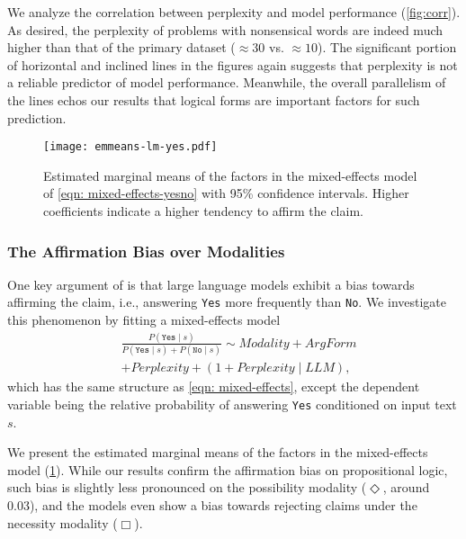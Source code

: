 We analyze the correlation between perplexity and model performance (\cref{fig:corr}).
As desired, the perplexity of problems with nonsensical words are indeed much higher than that of the primary dataset ($\approx 30$ vs. $\approx 10$).
The significant portion of horizontal and inclined lines in the figures again suggests that perplexity is not a reliable predictor of model performance.
Meanwhile, the overall parallelism of the lines echos our results that logical forms are important factors for such prediction.

\begin{figure}[t]
    \centering
    \vspace{-5pt}
    \texttt{[image: emmeans-lm-yes.pdf]}
    \vspace{-15pt}
    \caption{
        \label{fig:affirmation-rejection}
        Estimated marginal means of the factors in the mixed-effects model of \cref{eqn: mixed-effects-yesno} with 95\% confidence intervals. Higher coefficients indicate a higher tendency to affirm the claim.
    }
    \vspace{-10pt}
\end{figure}
\subsubsection{The Affirmation Bias over Modalities}
\label{subsec:affirmation-bias}

One key argument of \citet{dentella-etal-2023-systematic} is that large language models exhibit a bias towards affirming the claim, i.e., answering \texttt{Yes} more frequently than \texttt{No}.
We investigate this phenomenon by fitting a mixed-effects model
\begin{align}
     & \frac{P(\texttt{Yes}\mid s)}{P(\texttt{Yes} \mid s) + P(\texttt{No} \mid s)} \sim  \textit{Modality} + \textit{ArgForm} \nonumber \\
     & + \textit{Perplexity} + (1 + \textit{Perplexity} \mid \textit{LLM}),
    \label{eqn: mixed-effects-yesno}
\end{align}
which has the same structure as \cref{eqn: mixed-effects}, except the dependent variable being the relative probability of answering \texttt{Yes} conditioned on input text $s$.

We present the estimated marginal means of the factors in the mixed-effects model (\cref{fig:affirmation-rejection}).
While our results confirm the affirmation bias on propositional logic, such bias is slightly less pronounced on the possibility modality ($\Diamond$, around 0.03), and the models even show a bias towards rejecting claims under the necessity modality ($\Box$).
